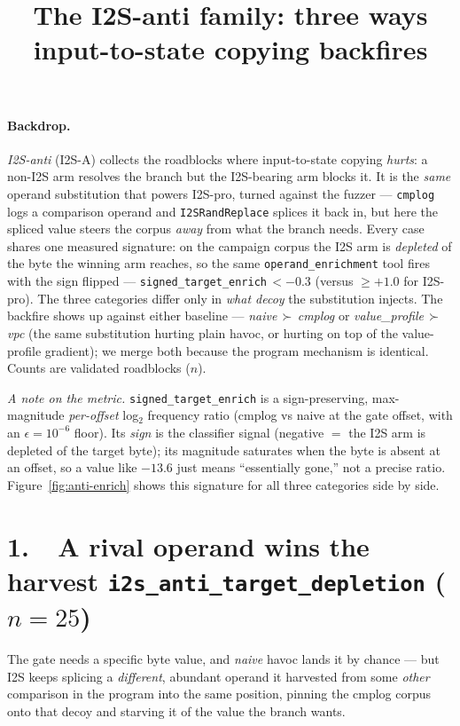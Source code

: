 \documentclass[11pt]{article}
\title{\textbf{The I2S-anti family: three ways input-to-state copying backfires}}
\author{}
\date{}
\begin{document}
\maketitle
\vspace{-3em}

\paragraph{Backdrop.} \emph{I2S-anti} (I2S-A) collects the roadblocks where
input-to-state copying \emph{hurts}: a non-I2S arm resolves the branch but the
I2S-bearing arm blocks it. It is the \emph{same} operand substitution that powers
I2S-pro, turned against the fuzzer --- \texttt{cmplog} logs a comparison operand
and \texttt{I2SRandReplace} splices it back in, but here the spliced value steers
the corpus \emph{away} from what the branch needs. Every case shares one measured
signature: on the campaign corpus the I2S arm is \emph{depleted} of the byte the
winning arm reaches, so the same \texttt{operand\_enrichment} tool fires with the
sign flipped --- \texttt{signed\_target\_enrich}\,$<-0.3$ (versus $\ge+1.0$ for
I2S-pro). The three categories differ only in \emph{what decoy} the substitution
injects. The backfire shows up against either baseline --- \emph{naive}$\,\succ\,$\emph{cmplog}
or \emph{value\_profile}$\,\succ\,$\emph{vpc} (the same substitution hurting plain
havoc, or hurting on top of the value-profile gradient); we merge both because the
program mechanism is identical. Counts are validated roadblocks ($n$).

\smallskip\noindent\textit{A note on the metric.} \texttt{signed\_target\_enrich}
is a sign-preserving, max-magnitude \emph{per-offset} log$_2$ frequency ratio
(cmplog vs naive at the gate offset, with an $\epsilon{=}10^{-6}$ floor). Its
\emph{sign} is the classifier signal (negative $=$ the I2S arm is depleted of the
target byte); its magnitude saturates when the byte is absent at an offset, so a
value like $-13.6$ just means ``essentially gone,'' not a precise ratio.
Figure~\ref{fig:anti-enrich} shows this signature for all three categories side by side.

\section*{1.\ \ A rival operand wins the harvest \hfill {\normalsize\texttt{i2s\_anti\_target\_depletion} ($n=25$)}}
The gate needs a specific byte value, and \emph{naive} havoc lands it by chance ---
but I2S keeps splicing a \emph{different}, abundant operand it harvested from some
\emph{other} comparison in the program into the same position, pinning the cmplog
corpus onto that decoy and starving it of the value the branch wants.
\end{document}
